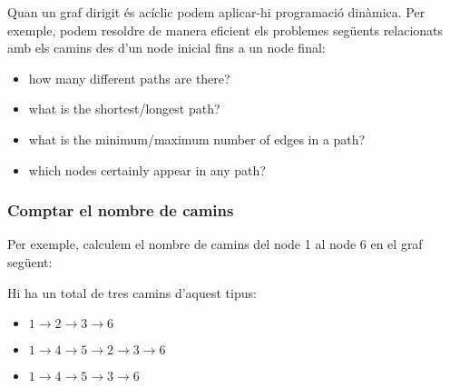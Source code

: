 Quan un graf dirigit és acíclic podem aplicar-hi programació
dinàmica. Per exemple, podem resoldre de manera eficient els problemes
següents relacionats amb els camins des d'un node inicial fins a un
node final:


\begin{itemize}
\item how many different paths are there?
\item what is the shortest/longest path?
\item what is the minimum/maximum number of edges in a path?
\item which nodes certainly appear in any path?
\end{itemize}


\subsubsection{Comptar el nombre de camins}

Per exemple, calculem el nombre de camins del node 1 al node 6 en el
graf següent:


\begin{center}
\end{center}
Hi ha un total de tres camins d'aquest tipus:
\begin{itemize}
\item $1 \rightarrow 2 \rightarrow 3 \rightarrow 6$
\item $1 \rightarrow 4 \rightarrow 5 \rightarrow 2 \rightarrow 3 \rightarrow 6$
\item $1 \rightarrow 4 \rightarrow 5 \rightarrow 3 \rightarrow 6$
\end{itemize}


